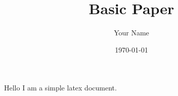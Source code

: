 \documentclass{article}  %
\title{Basic Paper}
\author{Your Name}
\date{\today}
\begin{document}
\maketitle
\newpage
\thispagestyle{fancy}
\section*{}
\paragraph{}
Hello I am a simple latex document.
\lipsum[1]
\paragraph{}
\lipsum[2]
\end{document}

